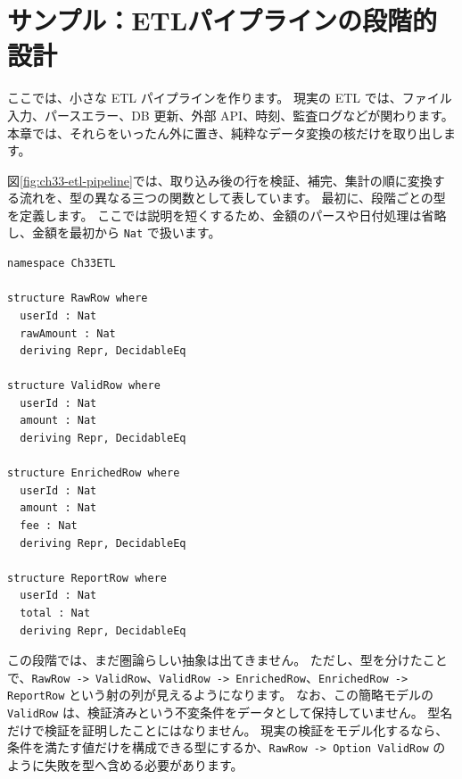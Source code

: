 \section{サンプル：ETLパイプラインの段階的設計}

ここでは、小さな ETL パイプラインを作ります。
現実の ETL では、ファイル入力、パースエラー、DB 更新、外部 API、時刻、監査ログなどが関わります。
本章では、それらをいったん外に置き、純粋なデータ変換の核だけを取り出します。


図\ref{fig:ch33-etl-pipeline}では、取り込み後の行を検証、補完、集計の順に変換する流れを、型の異なる三つの関数として表しています。
最初に、段階ごとの型を定義します。
ここでは説明を短くするため、金額のパースや日付処理は省略し、金額を最初から \texttt{Nat} で扱います。

\begin{listing}[htbp]
\begin{verbatim}
namespace Ch33ETL

structure RawRow where
  userId : Nat
  rawAmount : Nat
  deriving Repr, DecidableEq

structure ValidRow where
  userId : Nat
  amount : Nat
  deriving Repr, DecidableEq

structure EnrichedRow where
  userId : Nat
  amount : Nat
  fee : Nat
  deriving Repr, DecidableEq

structure ReportRow where
  userId : Nat
  total : Nat
  deriving Repr, DecidableEq
\end{verbatim}
\caption{\texttt{RawRow}・\texttt{ValidRow}・\texttt{EnrichedRow}・\texttt{ReportRow}}
\label{lst:ch33-etl-types}
\end{listing}

この段階では、まだ圏論らしい抽象は出てきません。
ただし、型を分けたことで、\texttt{RawRow -> ValidRow}、\texttt{ValidRow -> EnrichedRow}、\texttt{EnrichedRow -> ReportRow} という射の列が見えるようになります。
なお、この簡略モデルの \texttt{ValidRow} は、検証済みという不変条件をデータとして保持していません。
型名だけで検証を証明したことにはなりません。
現実の検証をモデル化するなら、条件を満たす値だけを構成できる型にするか、\texttt{RawRow -> Option ValidRow} のように失敗を型へ含める必要があります。

